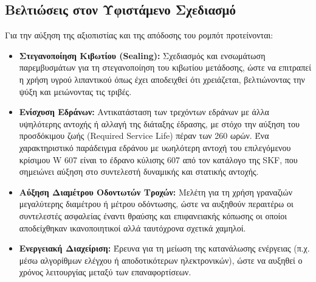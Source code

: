 


\subsection{Βελτιώσεις στον Υφιστάμενο Σχεδιασμό}
Για την αύξηση της αξιοπιστίας και της απόδοσης του ρομπότ προτείνονται:
\begin{itemize}
    \item \textbf{Στεγανοποίηση Κιβωτίου (Sealing):} Σχεδιασμός και ενσωμάτωση παρεμβυσμάτων για τη στεγανοποίηση του κιβωτίου μετάδοσης, ώστε να επιτραπεί η χρήση υγρού λιπαντικού όπως έχει αποδειχθεί ότι χρειάζεται, βελτιώνοντας την ψύξη και μειώνοντας τις τριβές.
    \item \textbf{Ενίσχυση Εδράνων:} Αντικατάσταση των τρεχόντων εδράνων με άλλα υψηλότερης αντοχής ή αλλαγή της διάταξης έδρασης, με στόχο την αύξηση του προσδόκιμου ζωής (Required Service Life) πέραν των 260 ωρών. Ένα χαρακτηριστικό παράδειγμα εδράνου με υωηλότερη αντοχή του επιλεγόμενου κρίσιμου W 607 είναι το έδρανο κύλισης 607 από τον κατάλογο της SKF, που σημειώνει αύξηση στο συντελεστή δυναμικής και στατικής αντοχής.
    \item \textbf{Αύξηση Διαμέτρου Οδοντωτών Τροχών:} Μελέτη για τη χρήση γραναζιών μεγαλύτερης διαμέτρου ή μέτρου οδόντωσης, ώστε να αυξηθούν περαιτέρω οι συντελεστές ασφαλείας έναντι θραύσης και επιφανειακής κόπωσης οι οποίοι αποδείχθηκαν ικανοποιητικοί αλλά ταυτόχρονα σχετικά χαμηλοί.
    \item \textbf{Ενεργειακή Διαχείριση:} Έρευνα για τη μείωση της κατανάλωσης ενέργειας (π.χ. μέσω αλγορίθμων ελέγχου ή αποδοτικότερων ηλεκτρονικών), ώστε να αυξηθεί ο χρόνος λειτουργίας μεταξύ των επαναφορτίσεων.
\end{itemize}

